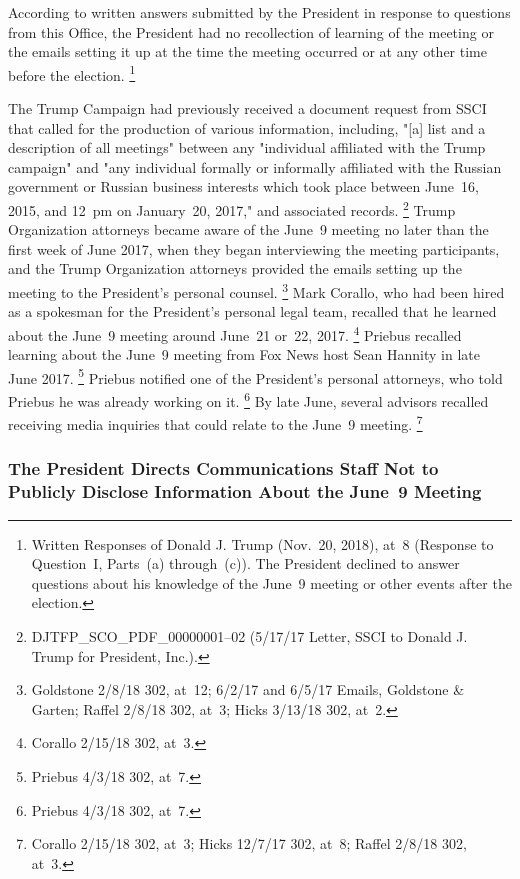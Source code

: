 According to written answers submitted by the President in response to questions from this Office, the President had no recollection of learning of the meeting or the emails setting it up at the time the meeting occurred or at any other time before the election.%
\footnote{Written Responses of Donald J. Trump (Nov.~20, 2018), at~8 (Response to Question~I, Parts~(a) through~(c)).
The President declined to answer questions about his knowledge of the June~9 meeting or other events after the election.}

The Trump Campaign had previously received a document request from SSCI that called for the production of various information, including, "[a] list and a description of all meetings" between any "individual affiliated with the Trump campaign" and "any individual formally or informally affiliated with the Russian government or Russian business interests which took place between June~16, 2015, and 12~pm on January~20, 2017," and associated records.%
\footnote{DJTFP\_SCO\_PDF\_00000001--02 (5/17/17 Letter, SSCI to Donald J. Trump for President, Inc.).}
Trump Organization attorneys became aware of the June~9 meeting no later than the first week of June 2017, when they began interviewing the meeting participants, and the Trump Organization attorneys provided the emails setting up the meeting to the President's personal counsel.%
\footnote{Goldstone 2/8/18 302, at~12;
6/2/17 and 6/5/17 Emails, Goldstone \& Garten;
Raffel 2/8/18 302, at~3;
Hicks 3/13/18 302, at~2.}
Mark Corallo, who had been hired as a spokesman for the President's personal legal team, recalled that he learned about the June~9 meeting around June~21 or~22, 2017.%
\footnote{Corallo 2/15/18 302, at~3.}
Priebus recalled learning about the June~9 meeting from Fox News host Sean Hannity in late June 2017.%
\footnote{Priebus 4/3/18 302, at~7.}
Priebus notified one of the President's personal attorneys, who told Priebus he was already working on it.%
\footnote{Priebus 4/3/18 302, at~7.}
By late June, several advisors recalled receiving media inquiries that could relate to the June~9 meeting.%
\footnote{Corallo 2/15/18 302, at~3;
Hicks 12/7/17 302, at~8;
Raffel 2/8/18 302, at~3.}

\subsubsection{The President Directs Communications Staff Not to Publicly Disclose Information About the June~9 Meeting}

